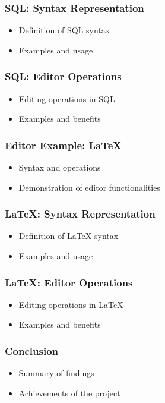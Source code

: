 \documentclass[t,24pt,aspectratio=169]{beamer}
\begin{document}
\begin{frame}[hvid]
    \frametitle{SQL: Syntax Representation}
    \begin{itemize}
        \item Definition of SQL syntax
        \item Examples and usage
    \end{itemize}
\end{frame}

\begin{frame}[hvid]
    \frametitle{SQL: Editor Operations}
    \begin{itemize}
        \item Editing operations in SQL
        \item Examples and benefits
    \end{itemize}
\end{frame}

\begin{frame}[hvid]
    \frametitle{Editor Example: LaTeX}
    \begin{itemize}
        \item Syntax and operations
        \item Demonstration of editor functionalities
    \end{itemize}
\end{frame}

\begin{frame}[hvid]
    \frametitle{LaTeX: Syntax Representation}
    \begin{itemize}
        \item Definition of LaTeX syntax
        \item Examples and usage
    \end{itemize}
\end{frame}

\begin{frame}[hvid]
    \frametitle{LaTeX: Editor Operations}
    \begin{itemize}
        \item Editing operations in LaTeX
        \item Examples and benefits
    \end{itemize}
\end{frame}

\begin{frame}[hvid]
    \frametitle{Conclusion}
    \begin{itemize}
        \item Summary of findings
        \item Achievements of the project
    \end{itemize}
\end{frame}
\end{document}

